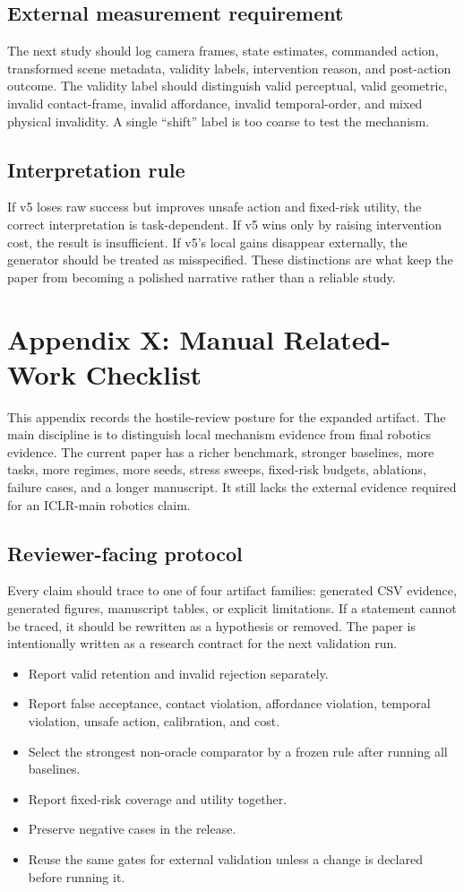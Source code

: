 \documentclass{article}
\begin{document}
\subsection{External measurement requirement}
The next study should log camera frames, state estimates, commanded action, transformed scene metadata, validity labels, intervention reason, and post-action outcome. The validity label should distinguish valid perceptual, valid geometric, invalid contact-frame, invalid affordance, invalid temporal-order, and mixed physical invalidity. A single ``shift'' label is too coarse to test the mechanism.

\subsection{Interpretation rule}
If v5 loses raw success but improves unsafe action and fixed-risk utility, the correct interpretation is task-dependent. If v5 wins only by raising intervention cost, the result is insufficient. If v5's local gains disappear externally, the generator should be treated as misspecified. These distinctions are what keep the paper from becoming a polished narrative rather than a reliable study.


\section{Appendix X: Manual Related-Work Checklist}
This appendix records the hostile-review posture for the expanded artifact. The main discipline is to distinguish local mechanism evidence from final robotics evidence. The current paper has a richer benchmark, stronger baselines, more tasks, more regimes, more seeds, stress sweeps, fixed-risk budgets, ablations, failure cases, and a longer manuscript. It still lacks the external evidence required for an ICLR-main robotics claim.

\subsection{Reviewer-facing protocol}
Every claim should trace to one of four artifact families: generated CSV evidence, generated figures, manuscript tables, or explicit limitations. If a statement cannot be traced, it should be rewritten as a hypothesis or removed. The paper is intentionally written as a research contract for the next validation run.

\begin{itemize}
\item Report valid retention and invalid rejection separately.
\item Report false acceptance, contact violation, affordance violation, temporal violation, unsafe action, calibration, and cost.
\item Select the strongest non-oracle comparator by a frozen rule after running all baselines.
\item Report fixed-risk coverage and utility together.
\item Preserve negative cases in the release.
\item Reuse the same gates for external validation unless a change is declared before running it.
\end{itemize}
\end{document}

